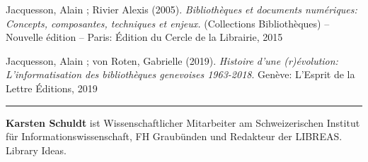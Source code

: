 \documentclass[a4paper,
fontsize=11pt,
oneside,
numbers=noperiodatend,
parskip=half-,
bibliography=totoc,
final
]{scrartcl}
\begin{document}
Jacquesson, Alain ; Rivier Alexis (2005). \emph{Bibliothèques et
documents numériques: Concepts, composantes, techniques et enjeux.}
(Collections Bibliothèques) -- Nouvelle édition -- Paris: Édition du
Cercle de la Librairie, 2015

Jacquesson, Alain ; von Roten, Gabrielle (2019). \emph{Histoire d'une
(r)évolution: L'informatisation des bibliothèques genevoises 1963-2018}.
Genève: L'Esprit de la Lettre Éditions, 2019

\begin{center}\rule{0.5\linewidth}{0.5pt}\end{center}

\textbf{Karsten Schuldt} ist Wissenschaftlicher Mitarbeiter am
Schweizerischen Institut für Informationswissenschaft, FH Graubünden und
Redakteur der LIBREAS. Library Ideas.
\end{document}
